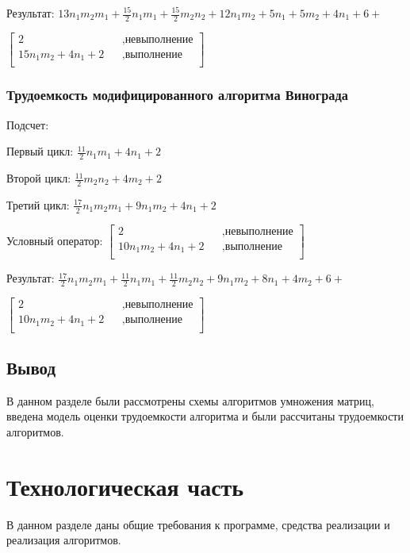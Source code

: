 \documentclass[12pt]{report}
\begin{document}
	Результат:	$13n_{1}m_{2}m_{1}+\frac{15}{2}n_{1}m_{1}+\frac{15}{2}m_{2}n_{2}+12n_{1}m_{2}+5n_{1}+5m_{2}+4n_{1}+6+$\par
	$\begin{bmatrix}
		2    &&, \text{невыполнение}\\
		15n_{1}m_{2} + 4n_{1} + 2 &&, \text{выполнение}\\
	\end{bmatrix} $

	\subsection{Трудоемкость модифицированного алгоритма Винограда}
	Подсчет:\par
	Первый цикл: $\frac{11}{2}n_{1}m_{1}+4n_{1}+2$\par
	Второй цикл: $\frac{11}{2}m_{2}n_{2}+4m_{2}+2$\par
	Третий цикл: $\frac{17}{2}n_{1}m_{2}m_{1}+9n_{1}m_{2}+4n_{1}+2$\par
	Условный оператор: 
	$\begin{bmatrix}
		2    &&, \text{невыполнение}\\
		10n_{1}m_{2} + 4n_{1} + 2 &&, \text{выполнение}\\
	\end{bmatrix}$\par
	Результат:
	$\frac{17}{2}n_{1}m_{2}m_{1}+\frac{11}{2}n_{1}m_{1}+\frac{11}{2}m_{2}n_{2}+9n_{1}m_{2}+8n_{1}+4m_{2}+6+$\par
	$\begin{bmatrix}
		2    &&, \text{невыполнение}\\
		10n_{1}m_{2} + 4n_{1} + 2 &&, \text{выполнение}\\
	\end{bmatrix}$
	
	\section{Вывод}
	В данном разделе были рассмотрены схемы алгоритмов умножения матриц, введена модель оценки трудоемкости алгоритма и были рассчитаны трудоемкости алгоритмов.
	
	\chapter{Технологическая часть}
	В данном разделе даны общие требования к программе, средства реализации и реализация алгоритмов.
\end{document}

